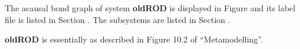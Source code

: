 
%

   The acausal bond graph of system \textbf{oldROD} is
   displayed in Figure  and its label
   file is listed in Section .
   The subsystems are listed in Section .

{\bf oldROD} is essentially as described in Figure 10.2 of
``Metamodelling''.
